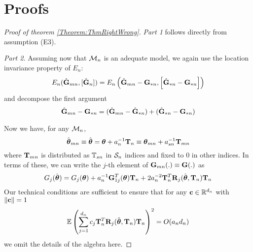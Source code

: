 \section{Proofs}
\label{evalues-proofs}

\begin{proof}[Proof of theorem \ref{Theorem:ThmRightWrong}]
\textit{Part 1} follows directly from assumption (E3).

\textit{Part 2.}
Assuming now that ${\cal{M}}_n$ is an adequate model, we again use the location invariance property of $E_n$:
%
\begin{align}
E_n ( \hat{{\mathbf{G}}}_{mn}, [ \hat{{\mathbf{G}}}_n]) = E_n \left( \hat{{\mathbf{G}}}_{mn} - {\mathbf{G}}_{* n}, \left[ \hat{{\mathbf{G}}}_{* n} - {\mathbf{G}}_{* n} \right] \right)
\end{align}
%
and decompose the first argument
%
\begin{align}\label{equation:ThmRightWrongProofPart2Eqn1}
\hat{{\mathbf{G}}}_{mn} - {\mathbf{G}}_{* n} = ( \hat{{\mathbf{G}}}_{mn} - \hat {{\mathbf{G}}}_{* n} ) + ( \hat {{\mathbf{G}}}_{* n} - {\mathbf{G}}_{* n} )
\end{align}
%

Now we have, for any ${\cal{M}}_n$,
%
$$
\hat {{\boldsymbol{\theta}}}_{m n} \equiv \hat{{\boldsymbol{\theta}}} = {\boldsymbol{\theta}} + a_{n}^{-1} {\mathbf{T}}_{n} \equiv {\boldsymbol{\theta}}_{m n} + a_{s n}^{-1} {\mathbf{T}}_{m n}
$$
%
where ${\mathbf{T}}_{m n}$ is distributed as ${\mathbb{T}}_{s n}$ in ${\cal{S}}_n$ indices and fixed to 0 in other indices. In terms of these, we can write the $j$-th element of ${\mathbf{G}}_{m n}(.) \equiv {\mathbf{G}}(.)$ as
%
\begin{align*}
G_{j}  (\hat{{\boldsymbol{\theta}}}  )
 = G_{j}  ( {{\boldsymbol{\theta}}}  )
+ a_{n}^{-1} {\mathbf{G}}_{1 j}^{T}  ( {{\boldsymbol{\theta}}}  ) {\mathbf{T}}_{ n} 
+ 2 a_{n}^{-2} {\mathbf{T}}_{ n}^{T} {\mathbf{R}}_{j}   ( \hat{{\boldsymbol{\theta}}}, {\mathbf{T}}_{ n}  ) {\mathbf{T}}_{ n}
\end{align*}
%
Our technical conditions are sufficient to ensure that for any ${\bf{c}} \in {\mathbb{R}}^{d_n}$ with 
$\| {\bf{c}} \| = 1$
\begin{align*} 
{\mathbb{E}} \left( \sum_{j =1}^{d_{n}} c_{j} {\mathbf{T}}_{ n}^{T} {\mathbf{R}}_{j}   ( \hat{{\boldsymbol{\theta}}}, {\mathbf{T}}_{ n}  ) {\mathbf{T}}_{ n} \right)^{2} = O (a_{n} d_{n}) 
\end{align*}
we omit the details of the algebra here.


\end{proof}

